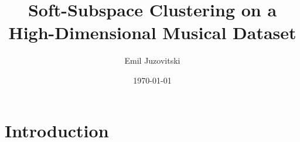 \documentclass[aspectratio=1610]{beamer}
\title{Soft-Subspace Clustering on a High-Dimensional Musical Dataset}
\date{\today}
\author{Emil Juzovitski}
\institute{Master Thesis Presentation}
\begin{document}
\maketitle




\section{Introduction}





\end{document}
